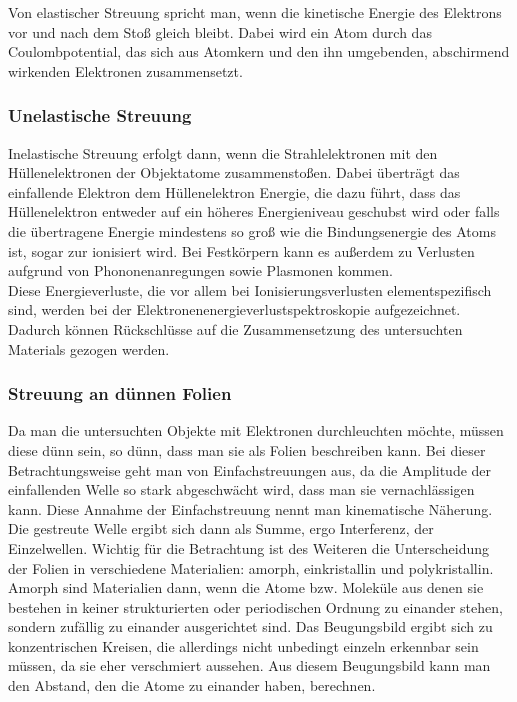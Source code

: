 \documentclass[slug=TEM, room=IFW, supervisor=?, coursedate=23.\ 01.\ 2020]{../../Lab_Report_LaTeX/lab_report}
\begin{document}
Von elastischer Streuung spricht man, wenn die kinetische Energie des Elektrons vor und nach dem
Stoß gleich bleibt. Dabei wird ein Atom durch das Coulombpotential, das sich aus Atomkern und den
ihn umgebenden, abschirmend wirkenden Elektronen zusammensetzt.

\subsubsection{Unelastische Streuung}
\label{sec:inelast}

Inelastische Streuung erfolgt dann, wenn die Strahlelektronen mit den Hüllenelektronen der
Objektatome zusammenstoßen. Dabei überträgt das einfallende Elektron dem Hüllenelektron Energie,
die dazu führt, dass das Hüllenelektron entweder auf ein höheres Energieniveau geschubst wird
oder falls die übertragene Energie mindestens so groß wie die Bindungsenergie des Atoms ist,
sogar zur ionisiert wird. Bei Festkörpern kann es außerdem zu Verlusten aufgrund von 
Phononenanregungen sowie Plasmonen kommen.\\

Diese Energieverluste, die vor allem bei Ionisierungsverlusten elementspezifisch sind, werden bei
der Elektronenenergieverlustspektroskopie aufgezeichnet. Dadurch können Rückschlüsse auf die
Zusammensetzung des untersuchten Materials gezogen werden.

\subsubsection{Streuung an dünnen Folien}
\label{sec:folie}

Da man die untersuchten Objekte mit Elektronen durchleuchten möchte, müssen diese dünn sein,
so dünn, dass man sie als Folien beschreiben kann. Bei dieser Betrachtungsweise geht man von
Einfachstreuungen aus, da die Amplitude der einfallenden Welle so stark abgeschwächt wird, dass
man sie vernachlässigen kann. Diese Annahme der Einfachstreuung nennt man kinematische Näherung.
Die gestreute Welle ergibt sich dann als Summe, ergo Interferenz, der Einzelwellen.
Wichtig für die Betrachtung ist des Weiteren die Unterscheidung der Folien in verschiedene
Materialien: amorph, einkristallin und polykristallin.\\

Amorph sind Materialien dann, wenn die Atome bzw. Moleküle aus denen sie bestehen in keiner
strukturierten oder periodischen Ordnung zu einander stehen, sondern zufällig zu einander
ausgerichtet sind. Das Beugungsbild ergibt sich zu konzentrischen Kreisen, die allerdings nicht
unbedingt einzeln erkennbar sein müssen, da sie eher verschmiert aussehen. Aus diesem Beugungsbild
kann man den Abstand, den die Atome zu einander haben, berechnen.\\
\end{document}
